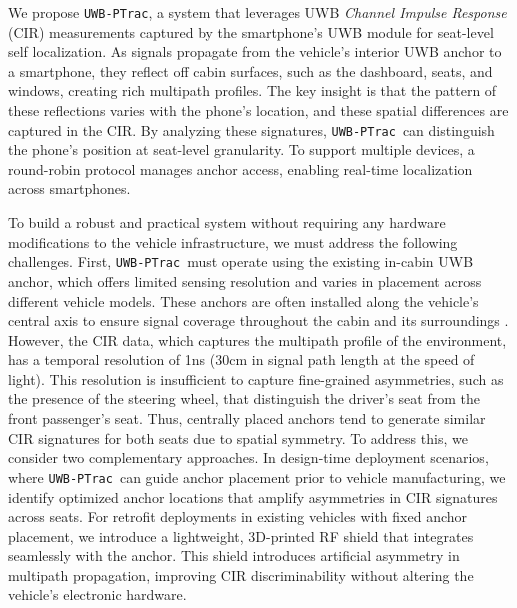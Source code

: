 \documentclass[sigconf]{acmart}
\newcommand{\name}{{{\tt UWB-PTrac}}}
\begin{document}
We propose \name, a system that leverages UWB \emph{Channel Impulse Response} (CIR) measurements captured by the smartphone's UWB module for seat-level self localization.
%
As signals propagate from the vehicle’s interior UWB anchor to a smartphone, they reflect off cabin surfaces, such as the dashboard, seats, and windows, creating rich multipath profiles.
%
The key insight is that the pattern of these reflections varies with the phone’s location, and these spatial differences are captured in the CIR.
%
By analyzing these signatures, \name~can distinguish the phone’s position at seat-level granularity. 
%
To support multiple devices, a round-robin protocol manages anchor access, enabling real-time localization across smartphones.

To build a robust and practical system without requiring any hardware modifications to the vehicle infrastructure, we must address the following challenges.
%
First, \name~must operate using the existing in-cabin UWB anchor, which offers limited sensing resolution and varies in placement across different vehicle models.
%
These anchors are often installed along the vehicle’s central axis to ensure signal coverage throughout the cabin and its surroundings \cite{fcc_audi_uwbtrx22_2021, fcc_bmw_fbd5_2021}. However, the CIR data, which captures the multipath profile of the environment, has a temporal resolution of 1ns \cite{Dw3000,UMusic} (30cm in signal path length at the speed of light).
%
This resolution is insufficient to capture fine-grained asymmetries, such as the presence of the steering wheel, that distinguish the driver’s seat from the front passenger's seat.
%
Thus, centrally placed anchors tend to generate similar CIR signatures for both seats due to spatial symmetry.
%
To address this, we consider two complementary approaches. 
%
In design-time deployment scenarios, where \name~can guide anchor placement prior to vehicle manufacturing, we identify optimized anchor locations that amplify asymmetries in CIR signatures across seats. 
%
For retrofit deployments in existing vehicles with fixed anchor placement, we introduce a lightweight, 3D-printed RF shield that integrates seamlessly with the anchor. This shield introduces artificial asymmetry in multipath propagation, improving CIR discriminability without altering the vehicle’s electronic hardware.
\end{document}
